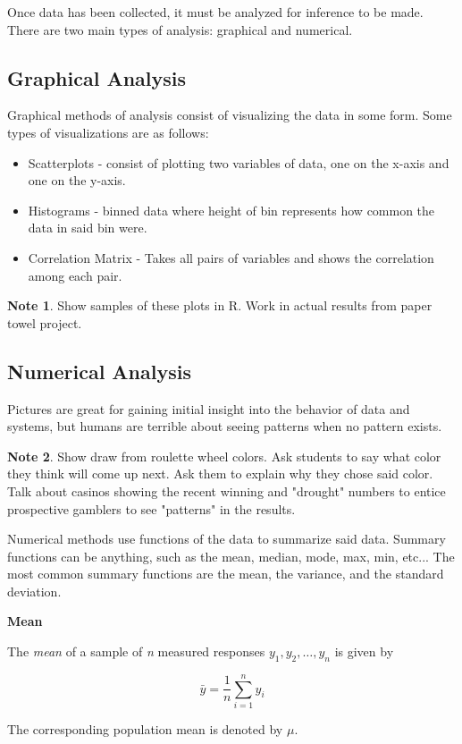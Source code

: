\documentclass[11pt]{article}
\theoremstyle{definition}
\newtheorem{note}{Note}
\begin{document}
Once data has been collected, it must be analyzed for inference to be made. There are two main types of analysis: graphical and numerical.

\subsection{Graphical Analysis}

Graphical methods of analysis consist of visualizing the data in some form. Some types of visualizations are as follows:

\begin{itemize}
	\item Scatterplots - consist of plotting two variables of data, one on the x-axis and one on the y-axis.
	\item Histograms - binned data where height of bin represents how common the data in said bin were.
	\item Correlation Matrix - Takes all pairs of variables and shows the correlation among each pair.
\end{itemize}

\begin{note}
	Show samples of these plots in R. Work in actual results from paper towel project.
\end{note}

\subsection{Numerical Analysis}

Pictures are great for gaining initial insight into the behavior of data and systems, but humans are terrible about seeing patterns when no pattern exists.

\begin{note}
	Show draw from roulette wheel colors. Ask students to say what color they think will come up next. Ask them to explain why they chose said color. Talk about casinos showing the recent winning and "drought" numbers to entice prospective gamblers to see "patterns" in the results.
\end{note}

Numerical methods use functions of the data to summarize said data. Summary functions can be anything, such as the mean, median, mode, max, min, etc... The most common summary functions are the mean, the variance, and the standard deviation.

\begin{shaded}

	\textbf{Mean} \newline

	The \textit{mean} of a sample of \textit{n} measured responses $y_1, y_2, \ldots, y_n$ is given by

	$$
	\bar{y} = \frac{1}{n} \sum_{i=1}^n y_i
	$$

	The corresponding population mean is denoted by $\mu$.

\end{shaded}
\end{document}
